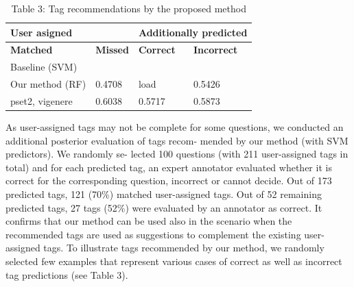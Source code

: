 \documentclass{sig-alternate}
\begin{document}
\begin{table}[]
\caption{Table 3: Tag recommendations by the proposed method
}
\hfill \break
\label{tab:my-table}
\begin{tabular}{|l|l|l|l|}
\hline
\multicolumn{2}{|l|}{\textbf{User asigned}} & \multicolumn{2}{l|}{\textbf{Additionally predicted}} \\ \hline
\textbf{Matched}      & \textbf{Missed}     & \textbf{Correct}         & \textbf{Incorrect}        \\ \hline
Baseline (SVM)        &                     &                          &                           \\ \hline
Our method (RF)       & 0.4708              & load                     & 0.5426                    \\ \hline
pset2, vigenere       & 0.6038              & 0.5717                   & 0.5873                    \\ \hline
\end{tabular}
\end{table}

As user-assigned tags may not be complete for some questions,
we conducted an additional posterior evaluation of tags recom-
mended by our method (with SVM predictors). We randomly se-
lected 100 questions (with 211 user-assigned tags in total) and for
each predicted tag, an expert annotator evaluated whether it is
correct for the corresponding question, incorrect or cannot decide.
Out of 173 predicted tags, 121 (70\%) matched user-assigned tags.
Out of 52 remaining predicted tags, 27 tags (52\%) were evaluated
by an annotator as correct. It confirms that our method can be
used also in the scenario when the recommended tags are used as
suggestions to complement the existing user-assigned tags.
To illustrate tags recommended by our method, we randomly
selected few examples that represent various cases of correct as
well as incorrect tag predictions (see Table 3).

\end{document}
